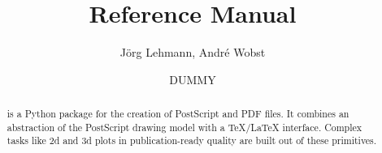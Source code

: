 \documentclass{manual}
\title{\PyX{} Reference Manual}
\author{J\"org Lehmann, Andr\'e Wobst}
\date{DUMMY}
\begin{document}
\maketitle
\cleardoublepage

\begin{abstract}
\noindent
\PyX{} is a Python package for the creation of PostScript and PDF files. It
combines an abstraction of the PostScript drawing model with a TeX/LaTeX
interface. Complex tasks like 2d and 3d plots in publication-ready quality are
built out of these primitives.
\end{abstract}

\tableofcontents

% 
% 
% 
% 
% 
% 
% 
% 
% 
% 
% 
% 
% 
% 
% 
% 
% 
% 
% 
% 
% 
% 
\end{document}
